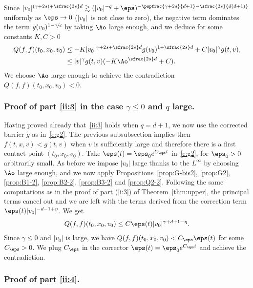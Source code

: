 Since
$|v_0|^{(\gamma+2s)+\sfrac{2s}d} \gtrsim (|v_0|^{-q} +
\eps)^{-\pspfrac{\gamma+2s}{d+1} - \sfrac{2s}{d(d+1)}}$ uniformly as
$\eps \to 0$ ($|v_0|$~is not close to zero), the negative term
dominates the term $g(v_0)^{1-\sfrac{\gamma}{d}}$ by taking $\Ao$ large
enough, and we deduce for some constants $K,C>0$
\begin{align*}
Q(f,f)(t_0,x_0,v_0) &\leq -K |v_0|^{\gamma+2s+\sfrac{2s}d} g(v_0)^{1+\sfrac{2s}d} + C |v_0|^{\gamma} g(t,v), \\
&\leq |v|^{\gamma} g(t,v)( -K \Ao^{\sfrac{2s}d} + C).
\end{align*}
We choose $\Ao$ large enough to achieve the contradiction
$Q(f,f)(t_0,x_0,v_0) <0$.

\subsubsection{Proof of part \eqref{ii:3} in the case $\gamma \le 0$
and $q$ large.}

Having proved already that~\eqref{ii:3} holds when $q=d+1$, we now
use the corrected barrier $\tilde g$ as in~\eqref{e:g2}. The
previous subsubsection implies then $f(t,x,v) < g(t,v)$ when $v$ is
sufficiently large and therefore there is a first contact point
$(t_0,x_0,v_0)$. Take $\eps(t) = \eps_0e^{C_\eps t}$
in~\eqref{e:g2}, for $\eps_0>0$ arbitrarily small. As before we
impose $|v_0|$ large thanks to the $L^\infty$ by choosing $\Ao$
large enough, and we now apply Propositions~\ref{prop:G-bis2},
\ref{prop:G2}, \ref{prop:B1-2}, \ref{prop:B2-2}, \ref{prop:B3-2} and
\ref{prop:Q2-2}. Following the same computations as in the proof of
part (\ref{i:3}) of Theorem~\ref{thm:upper}, the principal terms
cancel out and we are left with the terms derived from the
correction term $\eps(t) |v_0|^{-d-1+\eta}$. We get
\[
Q(f,f)(t_0,x_0,v_0) \leq C \eps(t) |v_0|^{\gamma+d+1-\eta}.
\]
Since $\gamma\leq 0$ and $|v_0|$ is large, we have
$Q(f,f)(t_0,x_0,v_0) < C_\eps \eps(t)$ for some $C_\eps >0$. We
plug $C_\eps$ in the corrector
$\eps(t) = \eps_0 e^{C_\eps t}$ and achieve the contradiction.

\subsubsection{Proof of part \eqref{ii:4}.}

